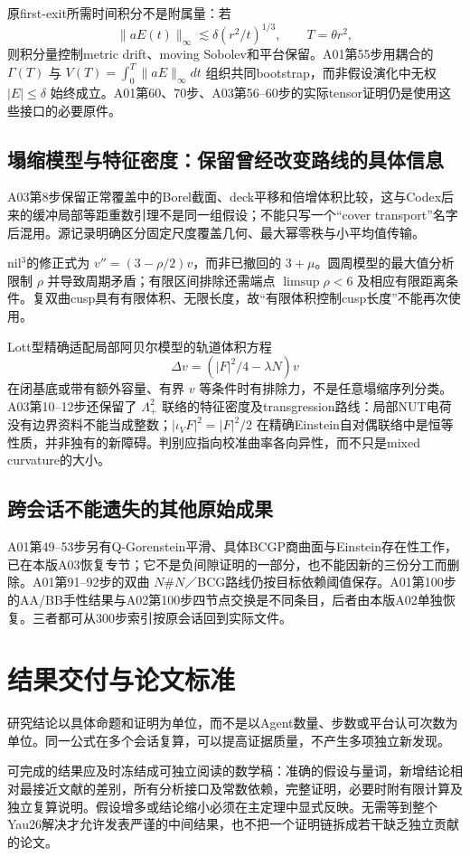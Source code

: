\documentclass[UTF8,a4paper,11pt,fontset=fandol]{ctexart}
\numberwithin{equation}{section}
\theoremstyle{definition}
\begin{document}
原first-exit所需时间积分不是附属量：若
\[
\|aE(t)\|_\infty\lesssim\delta(r^2/t)^{1/3},\qquad T=\theta r^2,
\]
则积分量控制metric drift、moving Sobolev和平台保留。A01第55步用耦合的 $\Gamma(T)$ 与 $V(T)=\int_0^T\|aE\|_\infty dt$ 组织共同bootstrap，而非假设演化中无权 $|E|\le\delta$ 始终成立。A01第60、70步、A03第56--60步的实际tensor证明仍是使用这些接口的必要原件。

\subsection{塌缩模型与特征密度：保留曾经改变路线的具体信息}
A03第8步保留正常覆盖中的Borel截面、deck平移和倍增体积比较，这与Codex后来的缓冲局部等距重数引理不是同一组假设；不能只写一个“cover transport”名字后混用。源记录明确区分固定尺度覆盖几何、最大幂零秩与小平均值传输。

nil$^3$的修正式为 $v''=(3-\rho/2)v$，而非已撤回的 $3+\mu$。圆周模型的最大值分析限制 $\rho$ 并导致周期矛盾；有限区间排除还需端点 $\limsup\rho<6$ 及相应有限距离条件。复双曲cusp具有有限体积、无限长度，故“有限体积控制cusp长度”不能再次使用。

Lott型精确适配局部阿贝尔模型的轨道体积方程
\[
\Delta v=(|F|^2/4-\lambda N)v
\]
在闭基底或带有额外容量、有界 $v$ 等条件时有排除力，不是任意塌缩序列分类。A03第10--12步还保留了 $\Lambda^2_+$ 联络的特征密度及transgression路线：局部NUT电荷没有边界资料不能当成整数；$|\iota_VF|^2=|F|^2/2$ 在精确Einstein自对偶联络中是恒等性质，并非独有的新障碍。判别应指向校准曲率各向异性，而不只是mixed curvature的大小。

\subsection{跨会话不能遗失的其他原始成果}
A01第49--53步另有Q-Gorenstein平滑、具体BCGP商曲面与Einstein存在性工作，已在本版A03恢复专节；它不是负间隙证明的一部分，也不能因新的三份分工而删除。A01第91--92步的双曲 $N\#N$／BCG路线仍按目标依赖阈值保存。A01第100步的AA/BB手性结果与A02第100步四节点交换是不同条目，后者由本版A02单独恢复。三者都可从300步索引按原会话回到实际文件。

\section{结果交付与论文标准}
研究结论以具体命题和证明为单位，而不是以Agent数量、步数或平台认可次数为单位。同一公式在多个会话复算，可以提高证据质量，不产生多项独立新发现。

可完成的结果应及时冻结成可独立阅读的数学稿：准确的假设与量词，新增结论相对最接近文献的差别，所有分析接口及常数依赖，完整证明，必要时附有限计算及独立复算说明。假设增多或结论缩小必须在主定理中显式反映。无需等到整个Yau26解决才允许发表严谨的中间结果，也不把一个证明链拆成若干缺乏独立贡献的论文。
\end{document}
